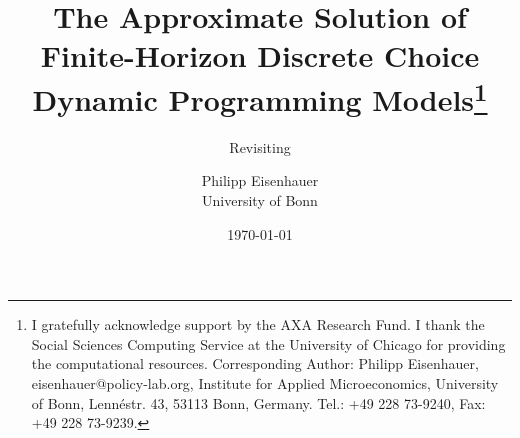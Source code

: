 \title{The Approximate Solution of Finite-Horizon Discrete Choice Dynamic Programming Models\thanks{I gratefully acknowledge support by the AXA Research Fund. I thank the Social Sciences Computing Service at the University of Chicago for providing the computational resources. Corresponding Author: Philipp Eisenhauer, eisenhauer@policy-lab.org, Institute for Applied Microeconomics, University of Bonn, Lenn\'{e}str. 43, 53113 Bonn, Germany. Tel.: +49 228 73-9240, Fax: +49 228 73-9239.}}
\subtitle{Revisiting  \citet{Keane.1994}}

\author{Philipp Eisenhauer\\
University of Bonn}
\date{\today}
